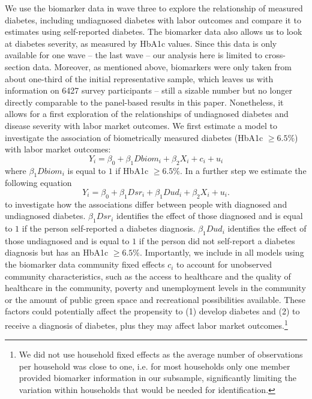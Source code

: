 \documentclass[12pt,english,british]{article}
\begin{document}
We use the biomarker data in wave three to explore the relationship of measured diabetes, including undiagnosed diabetes with labor outcomes and compare it to estimates using self-reported diabetes. The biomarker data also allows us to look at diabetes severity, as measured
by \ac{HbA1c} values. Since this data is only available for one wave -- the
last wave -- our analysis here is limited to cross-section data. Moreover,
as mentioned above, biomarkers were only taken from about one-third  of the initial representative sample, which leaves
us with information on 6427 survey participants -- still a sizable number but no longer directly comparable to the panel-based results in this paper.
Nonetheless, it allows for a first exploration of the relationships
of undiagnosed diabetes and disease severity with labor market
outcomes. We first estimate a model to investigate the association of biometrically  
measured diabetes (HbA1c $\geq6.5\%$) with labor market outcomes: 
\begin{equation}
Y_{i}=\beta_{0}+\beta_{1}Dbiom_{i}+\beta_{2}X_{i}+c_{i}+u_{i}\label{eq:diab_objective}
\end{equation}
where $\beta_{1}Dbiom_{i}$ is equal to $1$ if HbA1c $\geq6.5\%$.
In a further step we estimate the following equation 
\begin{equation}
Y_{i}=\beta_{0}+\beta_{1}Dsr_{i}+\beta_{1}Dud_{i}+\beta_{2}X_{i}+u_{i}.\label{eq:diab_sr_ud}
\end{equation}
to investigate how the associations differ between people with diagnosed
and undiagnosed diabetes. $\beta_{1}Dsr_{i}$ identifies the effect of those diagnosed
and is equal to $1$ if the person self-reported a diabetes diagnosis.
$\beta_{1}Dud_{i}$ identifies the effect of those undiagnosed and is equal to $1$
if the person did not self-report a diabetes diagnosis but has an
HbA1c $\geq6.5\%$. Importantly, we include in all models using the biomarker data community fixed effects $c_{i}$ to account for unobserved community characteristics, such as the access to healthcare and the quality of healthcare in the community, poverty and unemployment levels in the community or the amount of public green space and recreational possibilities available. These factors could potentially affect the propensity to (1) develop diabetes and (2) to receive a diagnosis of diabetes, plus they may affect labor market outcomes.\footnote{We did not use household fixed effects as the average number of observations per household was close to one, i.e. for most households only one member provided biomarker information in our subsample, significantly limiting the variation within households that would be needed for identification.}
\end{document}
